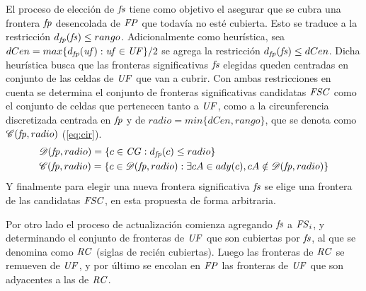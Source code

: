 El proceso de elección de $\mathit{fs}$ tiene como objetivo el asegurar que se
cubra una frontera $\mathit{fp}$ desencolada de $\mathit{FP}$ que todavía no esté
cubierta. Esto se traduce a la restricción $d_{\mathit{fp}}(\mathit{fs}) \leq rango$.
Adicionalmente como heurística, sea $dCen = max\{ d_{\mathit{fp}}(\mathit{\mathit{uf}}) :
\mathit{uf}\in\mathit{UF} \}/2$ se agrega la restricción $d_{\mathit{fp}}(\mathit{fs}) \leq dCen$.
Dicha heurística busca que las fronteras significativas $\mathit{fs}$ elegidas queden
centradas en conjunto de las celdas de $\mathit{UF}$ que van a cubrir. Con ambas
restricciones en cuenta se determina el conjunto de fronteras significativas
candidatas $\mathit{FSC}$ como el conjunto de celdas que pertenecen tanto a $\mathit{UF}$, como 
a la circunferencia discretizada centrada en $\mathit{fp}$ y de $radio = min
\{dCen, rango\}$, que se denota como $\mathscr{C}(\mathit{fp},radio)$
(\ref{eq:cir}).
\begin{equation} \label{eq:cir}
\begin{aligned}
&\mathscr{D}(\mathit{fp},radio) = \{c\in\mathit{CG} : d_{\mathit{fp}}(c) \leq radio\}\\ 
&\mathscr{C}(\mathit{fp},radio) = \{c\in\mathscr{D}(\mathit{fp},radio) : \exists cA \in ady(c), cA \notin \mathscr{D}(\mathit{fp},radio) \}
\end{aligned}
\end{equation}
Y finalmente para elegir una nueva frontera significativa $\mathit{fs}$ se elige una
frontera de las candidatas $\mathit{FSC}$, en esta propuesta de forma arbitraria.

Por otro lado el proceso de actualización comienza agregando $\mathit{fs}$ a
$\mathit{FS}_i$, y determinando el conjunto de fronteras de $\mathit{UF}$ que son
cubiertas por $\mathit{fs}$, al que se denomina como $\mathit{RC}$ (siglas de recién
cubiertas). Luego las fronteras de $\mathit{RC}$ se remueven de $\mathit{UF}$, y por
último se encolan en $\mathit{FP}$ las fronteras de $\mathit{UF}$ que son adyacentes
a las de $\mathit{RC}$.



